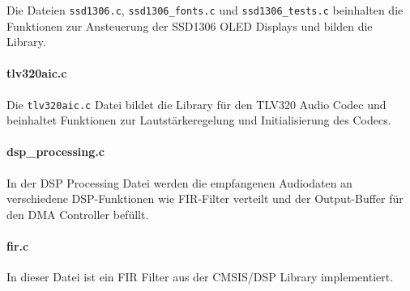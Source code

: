 Die Dateien \texttt{ssd1306.c}, \texttt{ssd1306\_fonts.c} und \texttt{ssd1306\_tests.c} beinhalten die Funktionen zur Ansteuerung der SSD1306 OLED Displays und bilden die Library.

\paragraph{tlv320aic.c}

Die \texttt{tlv320aic.c} Datei bildet die Library für den TLV320 Audio Codec und beinhaltet Funktionen zur Lautstärkeregelung und Initialisierung des Codecs.

\paragraph{dsp\_processing.c}

In der DSP Processing Datei werden die empfangenen Audiodaten an verschiedene DSP-Funktionen wie FIR-Filter verteilt und der Output-Buffer für den DMA Controller befüllt.

\paragraph{fir.c}

In dieser Datei ist ein FIR Filter aus der CMSIS/DSP Library implementiert.

